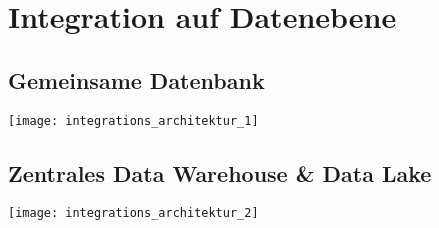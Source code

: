 
\section{Integration auf Datenebene}
\subsection{Gemeinsame Datenbank}
\texttt{[image: integrations\_architektur\_1]}
\subsection{Zentrales Data Warehouse \& Data Lake}
\texttt{[image: integrations\_architektur\_2]}
